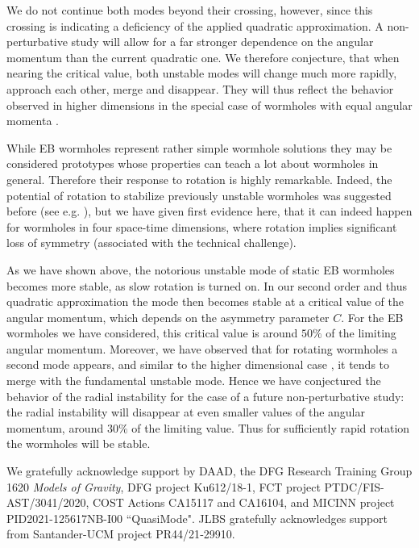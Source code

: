 \documentclass[twocolumn,showpacs,preprintnumbers,amsmath,amssymb,floatfix]{revtex4-1}
\begin{document}
We do not continue both modes beyond their crossing, however, since {this crossing} is indicating a %
{deficiency} of the applied quadratic approximation.
A non-perturbative study will allow for a far stronger dependence on the angular momentum than the current quadratic one.
We therefore conjecture, that when nearing the critical value, both unstable modes will change much more rapidly, approach each other, merge and disappear.
They will thus reflect the behavior observed in higher dimensions in the special case of wormholes with equal angular momenta \cite{Dzhunushaliev:2013jja}.


While EB wormholes represent rather simple wormhole solutions they may be considered prototypes whose properties can teach a lot about wormholes in general.
Therefore their response to rotation is highly remarkable.
Indeed, the potential of rotation to stabilize previously unstable wormholes was suggested before (see e.g. \cite{Matos:2005uh}), but we have given first evidence here, that it can indeed happen for wormholes in four space-time dimensions, where rotation implies significant loss of symmetry (associated with the technical challenge).

As we have shown above, the notorious unstable mode of static EB wormholes becomes more stable, as slow rotation is turned on.
In our second order and thus quadratic approximation the mode then becomes stable at a critical value of the angular momentum, which depends on the asymmetry parameter $C$.
For the EB wormholes we have considered, this critical value is around $50\%$ of the limiting angular momentum.
%
Moreover, we have observed that for rotating wormholes a second mode appears, {and} similar to the higher dimensional case \cite{Dzhunushaliev:2013jja}, it tends to merge with the fundamental unstable mode. 
Hence we have conjectured the behavior of the radial instability for the case of a future non-perturbative study: the radial instability will disappear at even smaller values of the angular momentum, around $30\%$ of the limiting {value}. 
%
%
Thus for {sufficiently} rapid rotation the 
%
wormholes will be stable.



We gratefully acknowledge support by DAAD, the DFG Research Training Group 1620 \textit{Models of Gravity}, 
DFG project Ku612/18-1, 
FCT project PTDC/FIS-AST/3041/2020, COST Actions CA15117 and CA16104, and MICINN project PID2021-125617NB-I00 ``QuasiMode".
JLBS gratefully acknowledges support from Santander-UCM project PR44/21‐29910.
\end{document}
